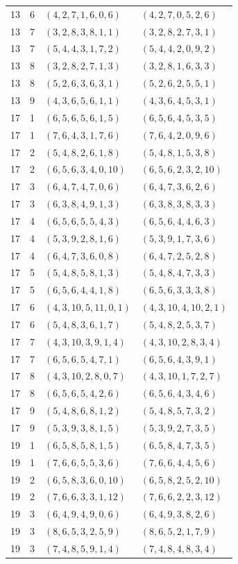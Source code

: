 \documentclass[11pt,a4paper]{article}
\theoremstyle{definition}
\numberwithin{equation}{section}
\begin{document}
\begin{longtable}{rrll}
13&6&$(4,2,7,1,6,0,6)$&$(4,2,7,0,5,2,6)$\\
13&7&$(3,2,8,3,8,1,1)$&$(3,2,8,2,7,3,1)$\\
13&7&$(5,4,4,3,1,7,2)$&$(5,4,4,2,0,9,2)$\\
13&8&$(3,2,8,2,7,1,3)$&$(3,2,8,1,6,3,3)$\\
13&8&$(5,2,6,3,6,3,1)$&$(5,2,6,2,5,5,1)$\\
13&9&$(4,3,6,5,6,1,1)$&$(4,3,6,4,5,3,1)$\\
17&1&$(6,5,6,5,6,1,5)$&$(6,5,6,4,5,3,5)$\\
17&1&$(7,6,4,3,1,7,6)$&$(7,6,4,2,0,9,6)$\\
17&2&$(5,4,8,2,6,1,8)$&$(5,4,8,1,5,3,8)$\\
17&2&$(6,5,6,3,4,0,10)$&$(6,5,6,2,3,2,10)$\\
17&3&$(6,4,7,4,7,0,6)$&$(6,4,7,3,6,2,6)$\\
17&3&$(6,3,8,4,9,1,3)$&$(6,3,8,3,8,3,3)$\\
17&4&$(6,5,6,5,5,4,3)$&$(6,5,6,4,4,6,3)$\\
17&4&$(5,3,9,2,8,1,6)$&$(5,3,9,1,7,3,6)$\\
17&4&$(6,4,7,3,6,0,8)$&$(6,4,7,2,5,2,8)$\\
17&5&$(5,4,8,5,8,1,3)$&$(5,4,8,4,7,3,3)$\\
17&5&$(6,5,6,4,4,1,8)$&$(6,5,6,3,3,3,8)$\\
17&6&$(4,3,10,5,11,0,1)$&$(4,3,10,4,10,2,1)$\\
17&6&$(5,4,8,3,6,1,7)$&$(5,4,8,2,5,3,7)$\\
17&7&$(4,3,10,3,9,1,4)$&$(4,3,10,2,8,3,4)$\\
17&7&$(6,5,6,5,4,7,1)$&$(6,5,6,4,3,9,1)$\\
17&8&$(4,3,10,2,8,0,7)$&$(4,3,10,1,7,2,7)$\\
17&8&$(6,5,6,5,4,2,6)$&$(6,5,6,4,3,4,6)$\\
17&9&$(5,4,8,6,8,1,2)$&$(5,4,8,5,7,3,2)$\\
17&9&$(5,3,9,3,8,1,5)$&$(5,3,9,2,7,3,5)$\\
19&1&$(6,5,8,5,8,1,5)$&$(6,5,8,4,7,3,5)$\\
19&1&$(7,6,6,5,5,3,6)$&$(7,6,6,4,4,5,6)$\\
19&2&$(6,5,8,3,6,0,10)$&$(6,5,8,2,5,2,10)$\\
19&2&$(7,6,6,3,3,1,12)$&$(7,6,6,2,2,3,12)$\\
19&3&$(6,4,9,4,9,0,6)$&$(6,4,9,3,8,2,6)$\\
19&3&$(8,6,5,3,2,5,9)$&$(8,6,5,2,1,7,9)$\\
19&3&$(7,4,8,5,9,1,4)$&$(7,4,8,4,8,3,4)$\\

\end{longtable}
\end{document}
